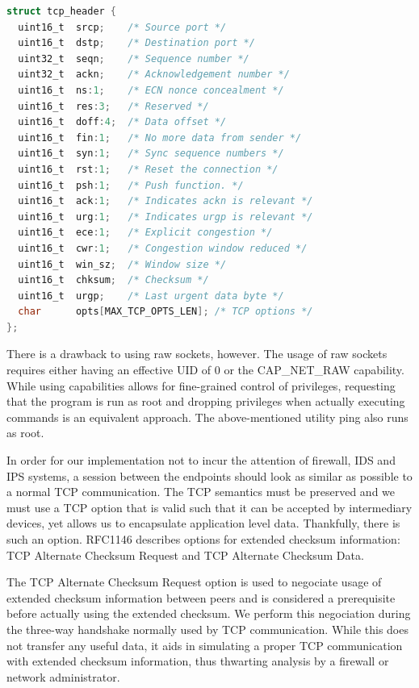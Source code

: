 \begin{lstlisting}[caption={Verbose TCP Header Structure},
                   label={lst:our-tcphdr},
                   basicstyle=\footnotesize,
                   captionpos=b,
                   frame=single,
                   language=C
                  ]
struct tcp_header {
  uint16_t  srcp;    /* Source port */
  uint16_t  dstp;    /* Destination port */
  uint32_t  seqn;    /* Sequence number */
  uint32_t  ackn;    /* Acknowledgement number */
  uint16_t  ns:1;    /* ECN nonce concealment */
  uint16_t  res:3;   /* Reserved */
  uint16_t  doff:4;  /* Data offset */
  uint16_t  fin:1;   /* No more data from sender */
  uint16_t  syn:1;   /* Sync sequence numbers */
  uint16_t  rst:1;   /* Reset the connection */
  uint16_t  psh:1;   /* Push function. */
  uint16_t  ack:1;   /* Indicates ackn is relevant */
  uint16_t  urg:1;   /* Indicates urgp is relevant */
  uint16_t  ece:1;   /* Explicit congestion */
  uint16_t  cwr:1;   /* Congestion window reduced */
  uint16_t  win_sz;  /* Window size */
  uint16_t  chksum;  /* Checksum */
  uint16_t  urgp;    /* Last urgent data byte */
  char      opts[MAX_TCP_OPTS_LEN]; /* TCP options */
};
\end{lstlisting}

There is a drawback to using raw sockets, however. The usage of raw sockets
requires either having an effective UID of 0 or the CAP_NET_RAW capability.
While using capabilities allows for fine-grained control of privileges, requesting
that the program is run as root and dropping privileges when actually executing
commands is an equivalent approach. The above-mentioned utility ping also
runs as root.

In order for our implementation not to incur the attention of firewall, IDS and
IPS systems, a session between the endpoints should look as similar as possible
to a normal TCP communication. The TCP semantics must be preserved and we must
use a TCP option that is valid such that it can be accepted by intermediary
devices, yet allows us to encapsulate application level data. Thankfully, there
is such an option. RFC1146 \cite{rfc1146} describes options for extended checksum
information: TCP Alternate Checksum Request and TCP Alternate Checksum Data.

The TCP Alternate Checksum Request option is used to negociate usage of extended
checksum information between peers and is considered a prerequisite before actually
using the extended checksum. We perform this negociation during the three-way
handshake normally used by TCP communication. While this does not transfer any
useful data, it aids in simulating a proper TCP communication with extended
checksum information, thus thwarting analysis by a firewall or network administrator.

